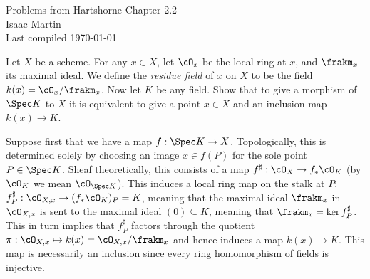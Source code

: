 


\pagestyle{empty}
	\LARGE
\begin{center}
	Problems from Hartshorne Chapter 2.2 \\
	\Large
	Isaac Martin \\
    Last compiled \today
\end{center}
\normalsize
\vspace{-2mm}
\hru
\begin{homework}[e]
	 Let $X$ be a scheme. For any $x \in X$, let $\cO_x$ be the local ring at $x$, and $\frakm_x$ its maximal ideal. We define the \emph{residue field} of $x$ on $X$ to be the field $k(x) = \cO_x/\frakm_x$. Now let $K$ be any field. Show that to give a morphism of $\Spec K$ to $X$ it is equivalent to give a point $x \in X$ and an inclusion map $k(x) \to K$.
	\begin{prf}
		Suppose first that we have a map $f:\Spec K \to X$. Topologically, this is determined solely by choosing an image $x\in f(P)$ for the sole point $P\in \Spec K$. Sheaf theoretically, this consists of a map $f^\sharp:\cO_X \to f_*\cO_K$ (by $\cO_K$ we mean $\cO_{\Spec K}$). This induces a local ring map on the stalk at $P$: $f^\sharp_P:\cO_{X,x}\to (f_*\cO_{K})_P = K$, meaning that the maximal ideal $\frakm_x$ in $\cO_{X,x}$ is sent to the maximal ideal $(0) \subseteq K$, meaning that $\frakm_x = \ker f^\sharp_P$. This in turn implies that $f^{\sharp}_P$ factors through the quotient $\pi:\cO_{X,x} \mapsto k(x) = \cO_{X,x}/\frakm_x$ and hence induces a map $k(x) \to K$. This map is necessarily an inclusion since every ring homomorphism of fields is injective.


\end{prf}
\end{homework}
